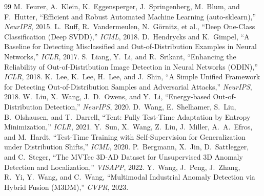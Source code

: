 \documentclass[10pt,conference]{IEEEtran}
\begin{document}
\begin{thebibliography}{99}
 M.~Feurer, A.~Klein, K.~Eggensperger, J.~Springenberg, M.~Blum, and F.~Hutter, ``Efficient and Robust Automated Machine Learning (auto-sklearn),'' \emph{NeurIPS}, 2015.
 L.~Ruff, R.~Vandermeulen, N.~G\"ornitz, et al., ``Deep One-Class Classification (Deep SVDD),'' \emph{ICML}, 2018.
 D.~Hendrycks and K.~Gimpel, ``A Baseline for Detecting Misclassified and Out-of-Distribution Examples in Neural Networks,'' \emph{ICLR}, 2017.
 S.~Liang, Y.~Li, and R.~Srikant, ``Enhancing the Reliability of Out-of-Distribution Image Detection in Neural Networks (ODIN),'' \emph{ICLR}, 2018.
 K.~Lee, K.~Lee, H.~Lee, and J.~Shin, ``A Simple Unified Framework for Detecting Out-of-Distribution Samples and Adversarial Attacks,'' \emph{NeurIPS}, 2018.
 W.~Liu, X.~Wang, J.~D.~Owens, and Y.~Li, ``Energy-based Out-of-Distribution Detection,'' \emph{NeurIPS}, 2020.
 D.~Wang, E.~Shelhamer, S.~Liu, B.~Olshausen, and T.~Darrell, ``Tent: Fully Test-Time Adaptation by Entropy Minimization,'' \emph{ICLR}, 2021.
 Y.~Sun, X.~Wang, Z.~Liu, J.~Miller, A.~A.~Efros, and M.~Hardt, ``Test-Time Training with Self-Supervision for Generalization under Distribution Shifts,'' \emph{ICML}, 2020.
 P.~Bergmann, X.~Jin, D.~Sattlegger, and C.~Steger, ``The MVTec 3D-AD Dataset for Unsupervised 3D Anomaly Detection and Localization,'' \emph{VISAPP}, 2022.
 Y.~Wang, J.~Peng, J.~Zhang, R.~Yi, Y.~Wang, and C.~Wang, ``Multimodal Industrial Anomaly Detection via Hybrid Fusion (M3DM),'' \emph{CVPR}, 2023.
\end{thebibliography}

\clearpage
\appendix

\end{document}
